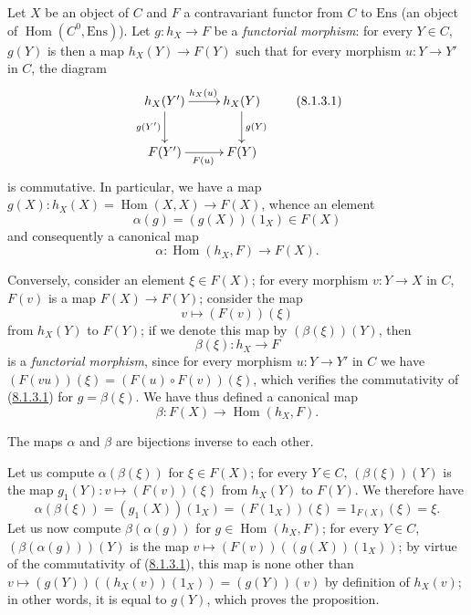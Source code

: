 \begin{env}[8.1.3]
\label{0.8.1.3}
Let $X$ be an object of $C$ and $F$ a contravariant functor from $C$ to
$\mathrm{Ens}$ (an object of $\operatorname{Hom}(C^0,\mathrm{Ens})$). Let
$g:h_X\to F$ be a \emph{functorial morphism}: for every $Y\in C$,
$g(Y)$ is then a map $h_X(Y)\to F(Y)$ such that for every morphism
$u:Y\to Y'$ in $C$, the diagram
\[
  \xymatrix{
    h_X(Y')\ar[r]^{h_X(u)}\ar[d]_{g(Y')} &
    h_X(Y)\ar[d]^{g(Y)}\\
    F(Y')\ar[r]_{F(u)} & F(Y)
  }
  \tag{8.1.3.1}\label{0.8.1.3.1}
\]
is commutative. In particular, we have a map
$g(X):h_X(X)=\operatorname{Hom}(X,X)\to F(X)$, whence an element
\[
  \alpha(g)=(g(X))(1_X)\in F(X)
  \tag{8.1.3.2}\label{0.8.1.3.2}
\]
and consequently a canonical map
\[
  \alpha:\operatorname{Hom}(h_X,F)\to F(X).
  \tag{8.1.3.3}\label{0.8.1.3.3}
\]

Conversely, consider an element $\xi\in F(X)$; for every morphism
$v:Y\to X$ in $C$, $F(v)$ is a map $F(X)\to F(Y)$;
consider the map
\[
  v\mapsto(F(v))(\xi)
  \tag{8.1.3.4}\label{0.8.1.3.4}
\]
from $h_X(Y)$ to $F(Y)$; if we denote this map by
$(\beta(\xi))(Y)$, then
\[
  \beta(\xi):h_X\to F
  \tag{8.1.3.5}\label{0.8.1.3.5}
\]
is a \emph{functorial morphism}, since for every morphism
$u:Y\to Y'$ in $C$ we have
$(F(vu))(\xi)=(F(u)\circ F(v))(\xi)$, which verifies the commutativity of
(\hyperref[0.8.1.3.1]{8.1.3.1}) for $g=\beta(\xi)$. We have thus defined
a canonical map
\[
  \beta:F(X)\to\operatorname{Hom}(h_X,F).
  \tag{8.1.3.6}\label{0.8.1.3.6}
\]
\end{env}

\begin{proposition}[8.1.4]
\label{0.8.1.4}
The maps $\alpha$ and $\beta$ are bijections inverse to each
other.
\end{proposition}

Let us compute $\alpha(\beta(\xi))$ for $\xi\in F(X)$; for every $Y\in C$,
$(\beta(\xi))(Y)$ is the map
$g_1(Y):v\mapsto(F(v))(\xi)$ from $h_X(Y)$ to $F(Y)$. We therefore have
\[
  \alpha(\beta(\xi))=(g_1(X))(1_X)=(F(1_X))(\xi)
  =1_{F(X)}(\xi)=\xi.
\]
Let us now compute $\beta(\alpha(g))$ for
$g\in\operatorname{Hom}(h_X,F)$; for every $Y\in C$,
$(\beta(\alpha(g)))(Y)$ is the map
$v\mapsto(F(v))((g(X))(1_X))$; by virtue of the commutativity of
(\hyperref[0.8.1.3.1]{8.1.3.1}), this map is none other than
$v\mapsto(g(Y))((h_X(v))(1_X))=(g(Y))(v)$ by definition of $h_X(v)$;
in other words, it is equal to $g(Y)$, which proves the proposition.

